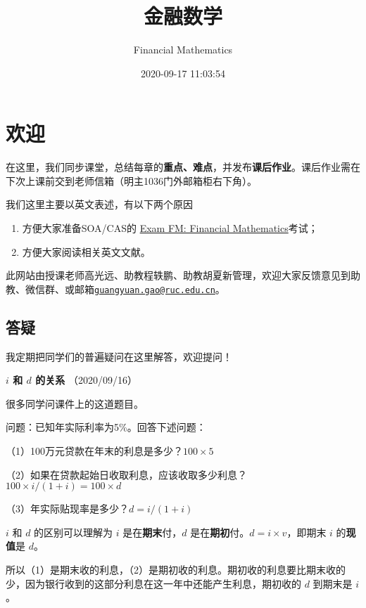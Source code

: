 \documentclass[
]{book}
\title{金融数学}
\author{Financial Mathematics}
\date{2020-09-17 11:03:54}
\begin{document}
\maketitle

{
\setcounter{tocdepth}{1}
\tableofcontents
}
\hypertarget{ux6b22ux8fce}{%
\chapter*{欢迎}\label{ux6b22ux8fce}}

在这里，我们同步课堂，总结每章的\textbf{重点、难点}，并发布\textbf{课后作业}。课后作业需在下次上课前交到老师信箱（明主1036门外邮箱柜右下角）。

我们这里主要以英文表述，有以下两个原因

\begin{enumerate}
\def\labelenumi{\arabic{enumi}.}
\item
  方便大家准备SOA/CAS的 \href{https://www.soa.org/education/exam-req/edu-exam-fm-detail/}{Exam FM: Financial Mathematics}考试；
\item
  方便大家阅读相关英文文献。
\end{enumerate}

此网站由授课老师高光远、助教程轶鹏、助教胡夏新管理，欢迎大家反馈意见到助教、微信群、或邮箱\href{mailto:guangyuan.gao@ruc.edu.cn}{\nolinkurl{guangyuan.gao@ruc.edu.cn}}。

\hypertarget{ux7b54ux7591}{%
\section*{答疑}\label{ux7b54ux7591}}

我定期把同学们的普遍疑问在这里解答，欢迎提问！

\textbf{\(i\) 和 \(d\) 的关系} （2020/09/16）

很多同学问课件上的这道题目。

问题：已知年实际利率为5\%。回答下述问题：

（1）100万元贷款在年末的利息是多少？\(100\times5%
\)

（2）如果在贷款起始日收取利息，应该收取多少利息？\(100\times i/(1+i)=100\times d\)

（3）年实际贴现率是多少？\(d=i/(1+i)\)

\(i\) 和 \(d\) 的区别可以理解为 \(i\) 是在\textbf{期末}付，\(d\) 是在\textbf{期初}付。\(d=i\times v\)，即期末 \(i\) 的\textbf{现值}是 \(d\)。

所以（1）是期末收的利息，（2）是期初收的利息。期初收的利息要比期末收的少，因为银行收到的这部分利息在这一年中还能产生利息，期初收的 \(d\) 到期末是 \(i\)。
\end{document}
